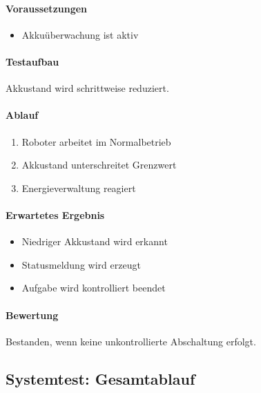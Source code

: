 \paragraph{Voraussetzungen}\label{voraussetzungen-31}

\begin{itemize}
\tightlist
\item
  Akkuüberwachung ist aktiv
\end{itemize}

\paragraph{Testaufbau}\label{testaufbau-8}

Akkustand wird schrittweise reduziert.

\paragraph{Ablauf}\label{ablauf-32}

\begin{enumerate}
\def\labelenumi{\arabic{enumi}.}
\tightlist
\item
  Roboter arbeitet im Normalbetrieb
\item
  Akkustand unterschreitet Grenzwert
\item
  Energieverwaltung reagiert
\end{enumerate}

\paragraph{Erwartetes Ergebnis}\label{erwartetes-ergebnis-32}

\begin{itemize}
\tightlist
\item
  Niedriger Akkustand wird erkannt
\item
  Statusmeldung wird erzeugt
\item
  Aufgabe wird kontrolliert beendet
\end{itemize}

\paragraph{Bewertung}\label{bewertung-32}

Bestanden, wenn keine unkontrollierte Abschaltung erfolgt.

\subsection{Systemtest: Gesamtablauf}\label{systemtest-gesamtablauf}


